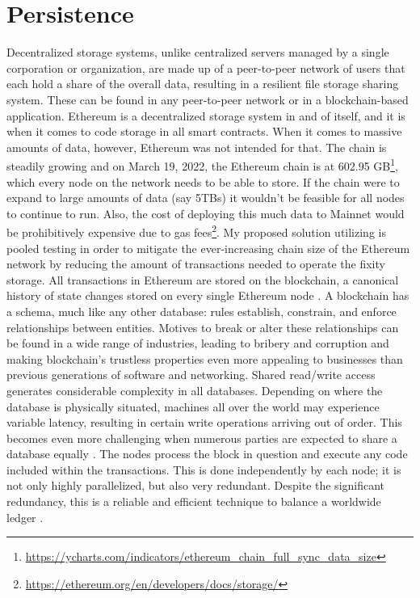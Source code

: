 \section{Persistence}\label{sec:persistence}
Decentralized storage systems, unlike centralized servers managed by a single corporation or organization, are made up of a peer-to-peer network of users that each hold a share of the overall data, resulting in a resilient file storage sharing system. These can be found in any peer-to-peer network or in a blockchain-based application. Ethereum is a decentralized storage system in and of itself, and it is when it comes to code storage in all smart contracts. When it comes to massive amounts of data, however, Ethereum was not intended for that. 
The chain is steadily growing and on March 19, 2022, the Ethereum chain is at 602.95 GB\footnote{\url{https://ycharts.com/indicators/ethereum_chain_full_sync_data_size}}, which every node on the network needs to be able to store. If the chain were to expand to large amounts of data (say 5TBs) it wouldn't be feasible for all nodes to continue to run. Also, the cost of deploying this much data to Mainnet would be prohibitively expensive due to gas fees\footnote{\url{https://ethereum.org/en/developers/docs/storage/}}.
My proposed solution utilizing is pooled testing in order to mitigate the ever-increasing chain size of the Ethereum network by reducing the amount of transactions needed to operate the fixity storage. 
All transactions in Ethereum are stored on the blockchain, a canonical history of state changes stored on every single Ethereum node \cite[12]{dannen2017introducing}.
A blockchain has a schema, much like any other database: rules establish, constrain, and enforce relationships between entities. Motives to break or alter these relationships can be found in a wide range of industries, leading to bribery and corruption and making blockchain's trustless properties even more appealing to businesses than previous generations of software and networking. Shared read/write access generates considerable complexity in all databases. Depending on where the database is physically situated, machines all over the world may experience variable latency, resulting in certain write operations arriving out of order. This becomes even more challenging when numerous parties are expected to share a database equally \cite[20]{dannen2017introducing}. 
The nodes process the block in question and execute any code included within the transactions. This is done independently by each node; it is not only highly parallelized, but also very redundant. Despite the significant redundancy, this is a reliable and efficient technique to balance a worldwide ledger \cite[50]{dannen2017introducing}.

